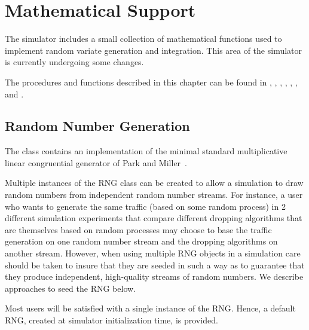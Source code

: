%
%
\chapter{Mathematical Support}
\label{chap:math}

The simulator includes a small collection of mathematical
functions used to implement random variate generation and integration.
This area of the simulator is currently undergoing some
changes.

The procedures and functions described in this chapter can be found in
,
,
,
,
,
, and
.


\section{Random Number Generation}
\label{sec:random}

The  class contains an implementation of the minimal standard
multiplicative linear congruential generator of
Park and Miller~\cite{Park88:Random}.

Multiple instances of the RNG class can be created to allow a
simulation to draw random numbers from independent random number
streams.  For instance, a user who wants to generate the same traffic
(based on some random process) in 2 different simulation experiments
that compare different dropping algorithms that are themselves based
on random processes may choose to base the traffic generation on one
random number stream and the dropping algorithms on another stream.
However, when using multiple RNG objects in a simulation care should
be taken to insure that they are seeded in such a way as to guarantee
that they produce independent, high-quality streams of random numbers.
We describe approaches to seed the RNG below.

Most users will be satisfied with a single instance of the RNG.
Hence, a default RNG, created at simulator initialization time, is
provided.

